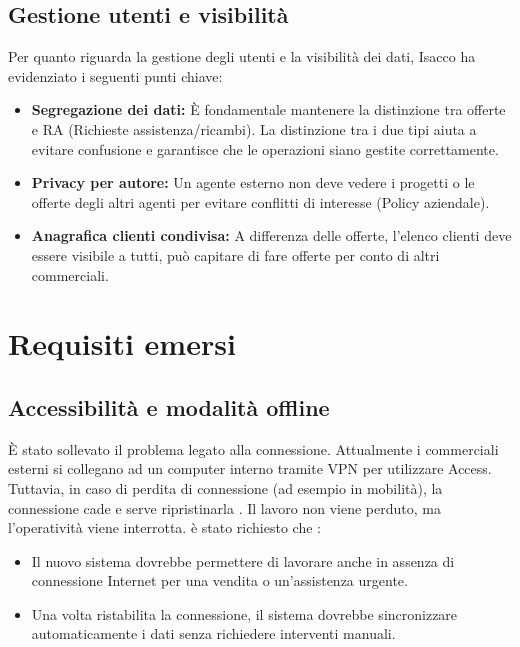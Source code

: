 \documentclass[12pt, a4paper]{article} %
\begin{document}
\subsection{Gestione utenti e visibilità}
Per quanto riguarda la gestione degli utenti e la visibilità dei dati, Isacco
ha evidenziato i seguenti punti chiave:
\begin{itemize}
      \item \textbf{Segregazione dei dati:} È fondamentale mantenere la distinzione tra offerte e RA (Richieste assistenza/ricambi).
            La distinzione tra i due tipi aiuta a evitare confusione e garantisce che le operazioni siano gestite correttamente.
      \item \textbf{Privacy per autore:} Un agente esterno non deve vedere i progetti o le offerte degli altri agenti per evitare conflitti di interesse (Policy aziendale).
      \item \textbf{Anagrafica clienti condivisa:} A differenza delle offerte, l'elenco clienti deve essere visibile a tutti,
            può capitare di fare offerte per conto di altri commerciali.
\end{itemize}

\section{Requisiti emersi}
\subsection{Accessibilità e modalità offline}
È stato sollevato il problema legato alla connessione. Attualmente i commerciali esterni si collegano ad un computer interno tramite VPN per utilizzare Access.
Tuttavia, in caso di perdita di connessione (ad esempio in mobilità), la connessione cade e serve ripristinarla . Il lavoro non viene perduto, ma l'operatività viene interrotta.
è stato richiesto che :
\begin{itemize}
      \item Il nuovo sistema dovrebbe permettere di lavorare anche in assenza di
            connessione Internet per una vendita o un'assistenza urgente.
      \item Una volta ristabilita la connessione, il sistema dovrebbe sincronizzare
            automaticamente i dati senza richiedere interventi manuali.
\end{itemize}
\end{document}
